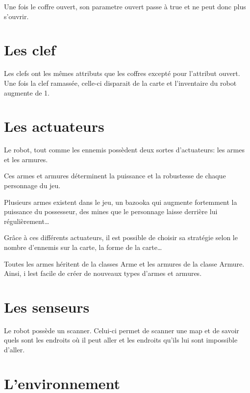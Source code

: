 \documentclass[a4paper 12pts]{article}
\begin{document}
Une fois le coffre ouvert, son parametre ouvert passe à true et ne peut donc plus s'ouvrir.


\section{Les clef}

Les clefs ont les mêmes attributs que les coffres excepté pour l'attribut ouvert. Une fois la clef ramassée, celle-ci disparait de la carte et l'inventaire du robot augmente de 1.

\section{Les actuateurs}

Le robot, tout comme les ennemis possèdent deux sortes d'actuateurs: les armes et les armures.

Ces armes et armures déterminent la puissance et la robustesse de chaque personnage du jeu.

Plusieurs armes existent dans le jeu, un bazooka qui augmente fortemment la puissance du possesseur, des mines que le personnage laisse derrière lui régulièrement\ldots

Grâce à ces différents actuateurs, il est possible de choisir sa stratégie selon le nombre d'ennemis sur la carte, la forme de la carte\ldots

Toutes les armes héritent de la classes Arme et les armures de la classe Armure. Ainsi, i lest facile de créer de nouveaux types d'armes et armures.

\section{Les senseurs}

Le robot possède un scanner. Celui-ci permet de scanner une map et de savoir quels sont les endroits où il peut aller et les endroits qu'ils lui sont impossible d'aller.

\newpage
\section{L'environnement}
\end{document}
